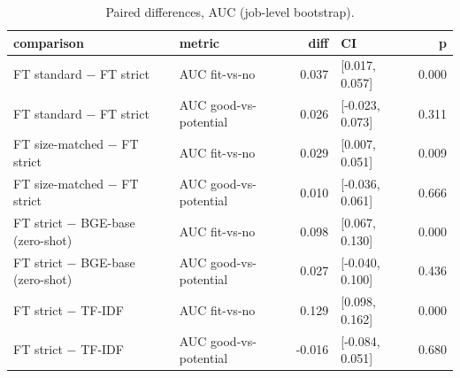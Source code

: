 \begin{table}
\caption{Paired differences, AUC (job-level bootstrap).}
\label{tab:t4b_memorisation_tests}
\begin{tabular}{llrlr}
\toprule
comparison & metric & diff & CI & p \\
\midrule
FT standard  −  FT strict & AUC fit-vs-no & 0.037 & [0.017, 0.057] & 0.000 \\
FT standard  −  FT strict & AUC good-vs-potential & 0.026 & [-0.023, 0.073] & 0.311 \\
FT size-matched  −  FT strict & AUC fit-vs-no & 0.029 & [0.007, 0.051] & 0.009 \\
FT size-matched  −  FT strict & AUC good-vs-potential & 0.010 & [-0.036, 0.061] & 0.666 \\
FT strict  −  BGE-base (zero-shot) & AUC fit-vs-no & 0.098 & [0.067, 0.130] & 0.000 \\
FT strict  −  BGE-base (zero-shot) & AUC good-vs-potential & 0.027 & [-0.040, 0.100] & 0.436 \\
FT strict  −  TF-IDF & AUC fit-vs-no & 0.129 & [0.098, 0.162] & 0.000 \\
FT strict  −  TF-IDF & AUC good-vs-potential & -0.016 & [-0.084, 0.051] & 0.680 \\
\bottomrule
\end{tabular}
\end{table}
